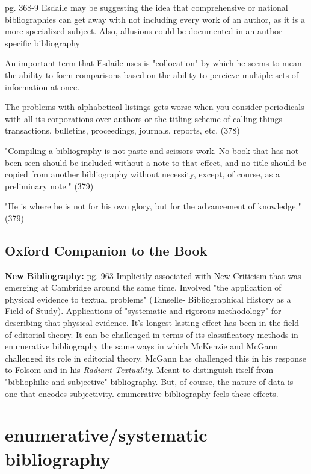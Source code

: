 \documentclass[course, english]{Notes}
\newcommand{\n}{\scalebox{2}{\textbf{\framebox{$\aleph$} } } }
\begin{document}
\begin{outline}
\1 \n pg. 368-9 Esdaile may be suggesting the idea that comprehensive or national bibliographies can get away with not including every work of an author, as it is a more specialized subject. 
	\2 Also, allusions could be documented in an author-specific bibliography

\1 An important term that Esdaile uses is "collocation" by which he seems to mean the ability to form comparisons based on the ability to percieve multiple sets of information at once. 

\1 The problems with alphabetical listings gets worse when you consider periodicals with all its corporations over authors or the titling scheme of calling things transactions, bulletins, proceedings, journals, reports, etc. (378)

\1 "Compiling a bibliography is not paste and scissors work. No book that has not been seen should be included without a note to that effect, and no title should be copied from another bibliography without necessity, except, of course, as a preliminary note." (379)

\1 "He is where he is not for his own glory, but for the advancement of knowledge." (379)

\end{outline}

\subsection{Oxford Companion to the Book}
\begin{outline}
\1 \textbf{New Bibliography:} pg. 963
Implicitly associated with New Criticism that was emerging at Cambridge around the same time. Involved "the application of physical evidence to textual problems" (Tanselle- Bibliographical History as a Field of Study). Applications of "systematic and rigorous methodology" for describing that physical evidence. It's longest-lasting effect has been in the field of editorial theory.
	\2 \n It can be challenged in terms of its classificatory methods in enumerative bibliography the same ways in which McKenzie and McGann challenged its role in editorial theory. 
		\3 McGann has challenged this in his response to Folsom and in his \textit{Radiant Textuality}.
	\2 Meant to distinguish itself from "bibliophilic and subjective" bibliography. But, of course, the nature of data is one that encodes subjectivity. 
		\3 enumerative bibliography feels these effects.
\end{outline}

\section{enumerative/systematic bibliography}
\end{document}
